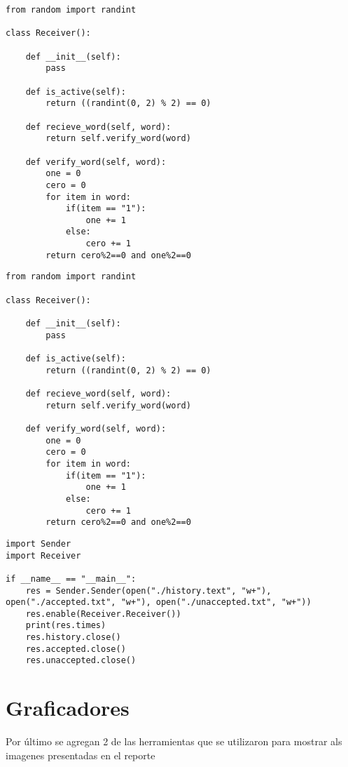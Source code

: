 \documentclass[a4paper]{article}
\begin{document}
            \begin{lstlisting}
from random import randint

class Receiver():

    def __init__(self):
        pass

    def is_active(self):
        return ((randint(0, 2) % 2) == 0)
    
    def recieve_word(self, word):
        return self.verify_word(word)

    def verify_word(self, word):
        one = 0
        cero = 0
        for item in word:
            if(item == "1"):
                one += 1
            else:
                cero += 1 
        return cero%2==0 and one%2==0
            \end{lstlisting}
            \begin{lstlisting}
from random import randint
                
class Receiver():
                
    def __init__(self):
        pass

    def is_active(self):
        return ((randint(0, 2) % 2) == 0)
    
    def recieve_word(self, word):
        return self.verify_word(word)

    def verify_word(self, word):
        one = 0
        cero = 0
        for item in word:
            if(item == "1"):
                one += 1
            else:
                cero += 1 
        return cero%2==0 and one%2==0
                            \end{lstlisting}
                            \begin{lstlisting}
import Sender
import Receiver

if __name__ == "__main__":
    res = Sender.Sender(open("./history.text", "w+"), open("./accepted.txt", "w+"), open("./unaccepted.txt", "w+"))
    res.enable(Receiver.Receiver())
    print(res.times)
    res.history.close()
    res.accepted.close()
    res.unaccepted.close()
                                            \end{lstlisting}
        \section{Graficadores}
            Por último se agregan 2 de las herramientas que se utilizaron para mostrar als imagenes presentadas en el reporte
\end{document}
